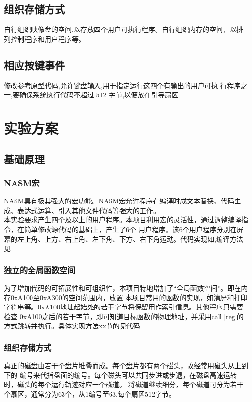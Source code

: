 \documentclass[a4paper]{article}
\newcommand{\codev}[1]{\textsf{#1}}
\begin{document}
    \subsection{组织存储方式}
    自行组织映像盘的空间,以存放四个用户可执行程序。自行组织内存的空间，以排列控制程序和用户程序等。
    \subsection{相应按键事件}
    修改参考原型代码,允许键盘输入,用于指定运行这四个有输出的用户可执
    行程序之一,要确保系统执行代码不超过 512 字节,以便放在引导扇区
\section{实验方案}
    \subsection{基础原理}
    \subsubsection{NASM宏} \label{subsec:NASMmacro}
    NASM具有极其强大的宏功能。NASM宏允许程序在编译时成文本替换、代码生成、表达式运算、引入其他文件代码等强大的工作。\\
    
    本实验要求产生四个及以上的用户程序。本项目利用宏的灵活性，通过调整编译指令，在简单修改源代码的基础上，产生了6个
    用户程序。该6个用户程序分别在屏幕的左上角、上方、右上角、左下角、下方、右下角运动。代码实现如,编译方法见%
    \subsubsection{独立的全局函数空间} \label{subsec:globalFunc}
    为了增加代码的可拓展性和可组织性，本项目特地增加了``全局函数空间''。即在内存0xA100至0xA300的空间范围内，放置
    本项目常用的函数的实现，如清屏和打印字符串等。0xA100地址起始处的若干字节将保留用作索引信息。其他程序只需要检查
    0xA100之后的若干字节，即可知道目标函数的物理地址，并采用\codev{call [reg]}的方式跳转并执行。具体实现方法xx节的见代码%
    \subsubsection{组织存储方式}
    真正的磁盘由若干个盘片堆叠而成。每个盘片都有两个磁头，故经常用磁头从上到下的
    编号来代指盘面的编号。每个磁头可以共同步进或步退，在磁盘高速运转时，磁头的每个运行轨迹对应一个磁道。
    将磁道继续细分，每个磁道可分为若干个扇区，通常分为63个，从1编号至63.每个扇区512字节。\\
    
\end{document}

